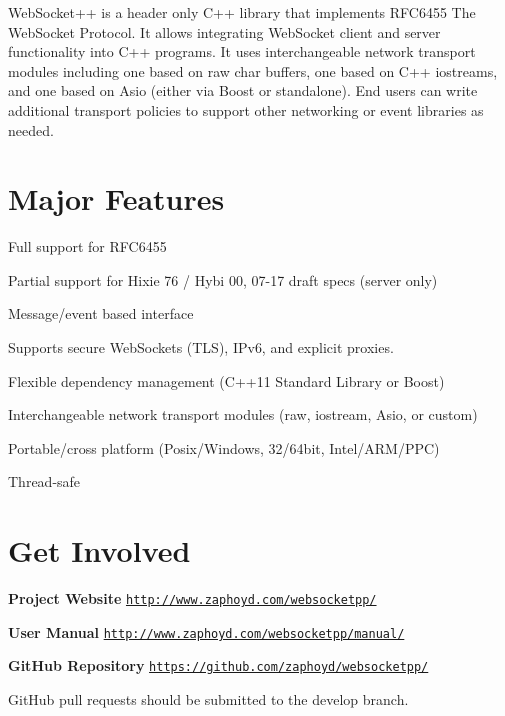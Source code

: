 Web\+Socket++ is a header only C++ library that implements R\+F\+C6455 The Web\+Socket Protocol. It allows integrating Web\+Socket client and server functionality into C++ programs. It uses interchangeable network transport modules including one based on raw char buffers, one based on C++ iostreams, and one based on Asio (either via Boost or standalone). End users can write additional transport policies to support other networking or event libraries as needed.

\section*{Major Features }


\begin{DoxyItemize}
\item Full support for R\+F\+C6455
\item Partial support for Hixie 76 / Hybi 00, 07-\/17 draft specs (server only)
\item Message/event based interface
\item Supports secure Web\+Sockets (T\+LS), I\+Pv6, and explicit proxies.
\item Flexible dependency management (C++11 Standard Library or Boost)
\item Interchangeable network transport modules (raw, iostream, Asio, or custom)
\item Portable/cross platform (Posix/\+Windows, 32/64bit, Intel/\+A\+R\+M/\+P\+PC)
\item Thread-\/safe
\end{DoxyItemize}

\section*{Get Involved }

\href{https://travis-ci.org/zaphoyd/websocketpp}{\tt }

{\bfseries Project Website} \href{http://www.zaphoyd.com/websocketpp/}{\tt http\+://www.\+zaphoyd.\+com/websocketpp/}

{\bfseries User Manual} \href{http://www.zaphoyd.com/websocketpp/manual/}{\tt http\+://www.\+zaphoyd.\+com/websocketpp/manual/}

{\bfseries Git\+Hub Repository} \href{https://github.com/zaphoyd/websocketpp/}{\tt https\+://github.\+com/zaphoyd/websocketpp/}

Git\+Hub pull requests should be submitted to the {\ttfamily develop} branch.

